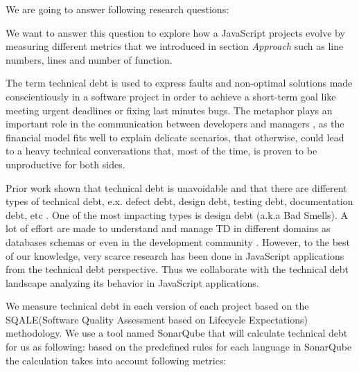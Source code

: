 
We are going to answer following research questions:

\noindent{\rqi}

We want to answer this question to explore how a JavaScript projects evolve by measuring different metrics that we introduced in section \textit{Approach} such as line numbers, lines and number of function.

\noindent{\rqii}

		 
The term technical debt is used to express faults and non-optimal solutions made conscientiously in a software project in order to achieve a short-term goal like meeting urgent deadlines or fixing last minutes bugs. The metaphor plays an important role in the communication between developers and managers \cite{kruchten2013MTD}, as the financial model fits well to explain delicate scenarios, that otherwise, could lead to a heavy technical conversations that, most of the time, is proven to be unproductive for both sides.  
		 
Prior work shown that technical debt is unavoidable \cite{zazworka2013MTD} and that there are different types of technical debt, e.x. defect debt, design debt, testing debt, documentation debt, etc \cite{Seaman2011MMTD} . One of the most impacting types is design debt \cite{zazworka2011MTD}\cite{Fontana2012MTD} (a.k.a Bad Smells). A lot of effort are made to understand and manage TD in different domains as databases schemas \cite{Weber2014MTD} or even in the development community \cite{Tamburri2013CHASE}. However, to the best of our knowledge, very scarce research has been done in JavaScript applications from the technical debt perspective. Thus we collaborate with the technical debt landscape analyzing its behavior in JavaScript applications. 

We measure technical debt in each version of each project based on the SQALE(Software Quality Assessment based on Lifecycle Expectations) methodology. We use a tool named SonarQube that will calculate technical debt for us as following: based on the predefined rules for each language in SonarQube the calculation takes into account following metrics:


